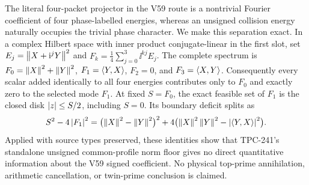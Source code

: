 The literal four-packet projector in the V59 route is a nontrivial Fourier
coefficient of four phase-labelled energies, whereas an unsigned collision
energy naturally occupies the trivial phase character.  We make this
separation exact.  In a complex Hilbert space with inner product
conjugate-linear in the first slot, set
$E_j=\left\lVert X+\mathrm{i}^jY\right\rVert^2$ and
$F_k=\frac14\sum_{j=0}^3\ii^{kj}E_j$.  The complete spectrum is
$F_0=\left\lVert X\right\rVert^2+\left\lVert Y\right\rVert^2$, $F_1=\left\langle Y,X\right\rangle$, $F_2=0$, and
$F_3=\left\langle X,Y\right\rangle$.  Consequently every scalar added identically to all four
energies contributes only to $F_0$ and exactly zero to the selected mode
$F_1$.  At fixed $S=F_0$, the exact feasible set of $F_1$ is the closed disk
$\left\lvert z\right\rvert\leq S/2$, including $S=0$.  Its boundary deficit splits as
\[
 S^2-4\left\lvert F_1\right\rvert^2
 =\bigl(\left\lVert X\right\rVert^2-\left\lVert Y\right\rVert^2\bigr)^2
  +4\bigl(\left\lVert X\right\rVert^2\left\lVert Y\right\rVert^2-\left\lvert \left\langle Y,X\right\rangle\right\rvert^2\bigr).
\]
Applied with source types preserved, these identities show that TPC-241's
standalone unsigned common-profile norm floor gives no direct quantitative
information about the V59 signed coefficient.  No physical top-prime
annihilation, arithmetic cancellation, or twin-prime conclusion is claimed.
